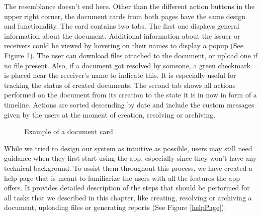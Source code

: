 The resemblance doesn't end here. Other than the different action buttons in the upper right corner, the document cards from both pages have the same design and functionality. The card contains two tabs. The first one displays general information about the document. Additional information about the issuer or receivers could be viewed by hovering on their names to display a popup (See Figure \ref{documentCard}).  The user can download files attached to the document, or upload one if no file present. Also, if a document got resolved by someone, a green checkmark is placed near the receiver's name to indicate this. It is especially useful for tracking the status of created documents. The second tab shows all actions performed on the document from its creation to the state it is in now in form of a timeline. Actions are sorted descending by date and include the custom messages given by the users at the moment of creation, resolving or archiving.

\begin{figure}[ht]
    \centering
    \qquad
    \caption{Example of a document card}
    \label{documentCard}
\end{figure}

While we tried to design our system as intuitive as possible, users may still need guidance when they first start using the app, especially since they won't have any technical background. To assist them throughout this process, we have created a help page that is meant to familiarize the users with all the features the app offers. It provides detailed description of the steps that should be performed for all tasks that we described in this chapter, like creating, resolving or archiving a document, uploading files or generating reports (See Figure \ref{helpPage}).


